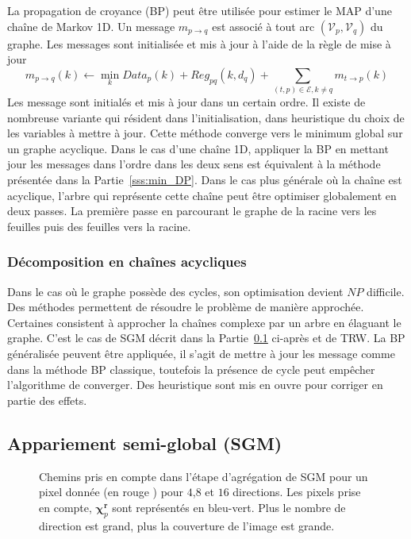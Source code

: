 \documentclass[../main/These_Mathias_Paget.tex]{subfiles}
\begin{document}
La propagation de croyance (BP) peut être utilisée pour estimer le MAP d'une chaîne de Markov 1D. Un message $m_{p \rightarrow q}$ est associé à tout arc $(\mathcal{V}_p,\mathcal{V}_q)$ du graphe. Les messages sont initialisée et mis à jour à l'aide de la règle de mise à jour
\begin{equation}
m_{p \rightarrow q}(k) \leftarrow \min_{k}{Data_p(k) + Reg_{pq}(k,d_q) + \sum_{(t,p) \in \mathcal{E}, k \neq q} m_{t \rightarrow p}(k)}
\end{equation}
Les message sont initialés et mis à jour dans un certain ordre. Il existe de nombreuse variante qui résident dans l'initialisation, dans heuristique du choix de les variables à mettre à jour. Cette méthode converge vers le minimum global sur un graphe acyclique. Dans le cas d'une chaîne 1D, appliquer la BP en mettant jour les messages dans l'ordre dans les deux sens est équivalent à la méthode présentée dans la Partie~\ref{sss:min_DP}. Dans le cas plus générale où la chaîne est acyclique, l'arbre qui représente cette chaîne peut être optimiser globalement en deux passes. La première passe en parcourant le graphe de la racine vers les feuilles puis des feuilles vers la racine.

\subsubsection{Décomposition en chaînes acycliques}

Dans le cas où le graphe possède des cycles, son optimisation devient $NP$ difficile. Des méthodes permettent de résoudre le problème de manière approchée. Certaines consistent à approcher la chaînes complexe par un arbre en élaguant le graphe. C'est le cas de SGM décrit dans la Partie~\ref{ss:SGM} ci-après et de TRW. La BP généralisée peuvent être appliquée, il s'agit de mettre à jour les message comme dans la méthode BP classique, toutefois la présence de cycle peut empêcher l'algorithme de converger. Des heuristique sont mis en ouvre pour corriger en partie des effets.

\subsection{Appariement semi-global (SGM)}
\label{ss:SGM}

\begin{figure}
\centering
\caption{Chemins pris en compte dans l'étape d'agrégation de SGM pour un pixel donnée (en \color{red} rouge \color{black}) pour $4$,$8$ et $16$ directions. Les pixels prise en compte, $\boldsymbol{\chi}^{\boldsymbol{r}}_p$ sont représentés en bleu-vert. Plus le nombre de direction est grand, plus la couverture de l'image est grande.}
\label{fig:SGM_16}
\end{figure}
\end{document}
